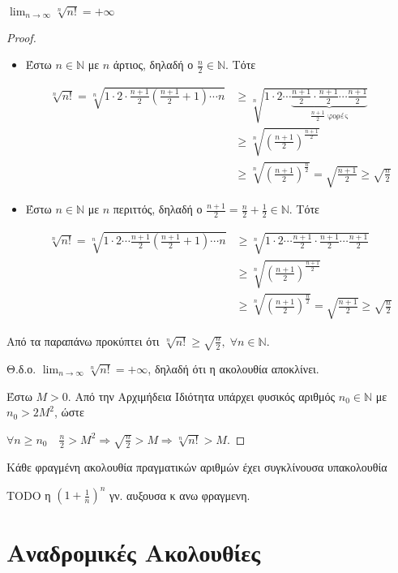 \documentclass[main.tex]{subfiles}
\begin{document}
\begin{prop}
    $ \lim_{n \to \infty} \sqrt[n]{n!} = +\infty $ 
\end{prop}


\begin{proof}
\item {}
    \begin{itemize}
        \item 
    Έστω $ n \in \mathbb{N} $ με $ n $ άρτιος, δηλαδή ο $ \frac{n}{2} \in
    \mathbb{N} $. Τότε

    \begin{align*}
        \sqrt[n]{n!} = \sqrt[n]{1 \cdot 2 \cdot \frac{n+1}{2}
            \left(\frac{n+1}{2} +1\right) \cdots n} &\geq \sqrt[n]{1\cdot 2 \cdots
            \underbrace{\frac{n+1}{2} \cdot \frac{n+1}{2} \cdots \frac{n+1}{2}}_{
        \frac{n+1}{2} \; \text{φορές}}} \\
&\geq
\sqrt[n]{\left(\frac{n+1}{2}\right)^{\frac{n+1}{2}}} \\ 
&\geq \sqrt[n]{\left(\frac{n+1}{2}\right)^{\frac{n}{2}}} =
\sqrt{ \frac{n+1}{2} } \geq \sqrt{\frac{n}{2}} 
     \end{align*} 

 \item Έστω $ n \in \mathbb{N} $ με $ n $ περιττός, δηλαδή ο $
     \frac{n+1}{2} = \frac{n}{2} + \frac{1}{2} \in \mathbb{N}  $. Τότε

     \begin{align*}
         \sqrt[n]{n!} = \sqrt[n]{1\cdot 2 \cdots \frac{n+1}{2}
             \left(\frac{n+1}{2} +1\right) \cdots n}
             &\geq \sqrt[n]{1 \cdot 2 \cdots
     \frac{n+1}{2}  \cdot \frac{n+1}{2} \cdots \frac{n+1}{2} } \\ 
             &\geq 
     \sqrt[n]{\left(\frac{n+1}{2} \right)^{\frac{n+1}{2}}} \\ 
             & \geq
     \sqrt[n]{\left(\frac{n+1}{2} \right)^{\frac{n}{2}}} = \sqrt{\frac{n+1}{2}} \geq 
     \sqrt{\frac{n}{2}}
     \end{align*}
    \end{itemize}

    Από τα παραπάνω προκύπτει ότι $ \sqrt[n]{n!} \geq \sqrt{\frac{n}{2}
    }, \; \forall n \in \mathbb{N} $. 

    Θ.δ.ο. $ \lim_{n \to \infty} \sqrt[n]{n!} = + \infty $, δηλαδή ότι 
    η ακολουθία αποκλίνει.

    Έστω $ M >0 $. Από την Αρχιμήδεια Ιδιότητα υπάρχει φυσικός αριθμός $ 
    n_{0} \in  \mathbb{N} $ με $ n_{0}>2M^{2} $, ώστε 

    $ \forall n \geq n_{0} \quad \frac{n}{2} > M^{2} \Rightarrow
    \sqrt{\frac{n}{2}} > M \Rightarrow \sqrt[n]{n!} > M $. 
\end{proof}

\begin{thm}
    Κάθε φραγμένη ακολουθία πραγματικών αριθμών έχει συγκλίνουσα υπακολουθία
\end{thm}


TODO η $ (1+ \frac{1}{n} )^{n} $ γν. αυξουσα κ ανω φραγμενη.

\section{Αναδρομικές Ακολουθίες}
\end{document}
